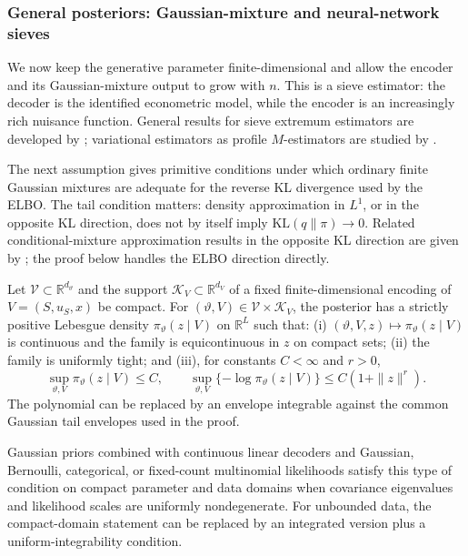\subsubsection{General posteriors: Gaussian-mixture and neural-network sieves}
\label{subsubsec:general_sieve}

We now keep the generative parameter finite-dimensional and allow the encoder
and its Gaussian-mixture output to grow with $n$.  This is a sieve estimator:
the decoder is the identified econometric model, while the encoder is an
increasingly rich nuisance function.  General results for sieve extremum
estimators are developed by \citet{Chen2007Sieve}; variational estimators as
profile $M$-estimators are studied by \citet{WestlingMcCormick2019}.

The next assumption gives primitive conditions under which ordinary finite
Gaussian mixtures are adequate for the reverse KL divergence used by the
ELBO.  The tail condition matters: density approximation in $L^1$, or in the
opposite KL direction, does not by itself imply
$\mathrm{KL}(q\|\pi)\to0$.  Related conditional-mixture approximation
results in the opposite KL direction are given by
\citet{Norets2010Conditional}; the proof below handles the ELBO direction
directly.

\begin{assumption}
\label{ass:posterior_regular}
Let $\mathcal V\subset\mathbb R^{d_\vartheta}$ and the support
$\mathcal K_V\subset\mathbb R^{d_V}$ of a fixed finite-dimensional encoding
of $V=(S,u_S,x)$ be compact.  For
$(\vartheta,V)\in\mathcal V\times\mathcal K_V$, the posterior has a strictly
positive Lebesgue density $\pi_\vartheta(z\mid V)$ on $\mathbb R^L$ such
that: (i) $(\vartheta,V,z)\mapsto\pi_\vartheta(z\mid V)$ is continuous and
the family is equicontinuous in $z$ on compact sets; (ii) the family is
uniformly tight; and (iii), for constants $C<\infty$ and $r>0$,
\[
 \sup_{\vartheta,V}\pi_\vartheta(z\mid V)\le C,
 \qquad
 \sup_{\vartheta,V}\{-\log\pi_\vartheta(z\mid V)\}
 \le C(1+\|z\|^r).
\]
The polynomial can be replaced by an envelope integrable against the common
Gaussian tail envelopes used in the proof.
\end{assumption}

Gaussian priors combined with continuous linear decoders and Gaussian,
Bernoulli, categorical, or fixed-count multinomial likelihoods satisfy this
type of condition on compact parameter and data domains when covariance
eigenvalues and likelihood scales are uniformly nondegenerate.  For unbounded
data, the compact-domain statement can be replaced by an integrated version
plus a uniform-integrability condition.

